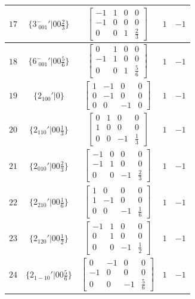 \documentclass[fleqn,8pt]{jsarticle}
\begin{document}
\begin{longtable}{ccccc}
$ 17 $ & $ \{3^{-}_{\,\,001}{}'|0 0 \frac{2}{3}\} $ & $ \begin{bmatrix} -1 & 1 & 0 & 0 \\ -1 & 0 & 0 & 0 \\ 0 & 0 & 1 & \frac{2}{3} \end{bmatrix} $ & $ 1 $ & $ -1 $ \\ \hline
$ 18 $ & $ \{6^{-}_{\,\,001}{}'|0 0 \frac{5}{6}\} $ & $ \begin{bmatrix} 0 & 1 & 0 & 0 \\ -1 & 1 & 0 & 0 \\ 0 & 0 & 1 & \frac{5}{6} \end{bmatrix} $ & $ 1 $ & $ -1 $ \\ \hline
$ 19 $ & $ \{2{}_{100}{}'|0\} $ & $ \begin{bmatrix} 1 & -1 & 0 & 0 \\ 0 & -1 & 0 & 0 \\ 0 & 0 & -1 & 0 \end{bmatrix} $ & $ 1 $ & $ -1 $ \\ \hline
$ 20 $ & $ \{2{}_{110}{}'|0 0 \frac{1}{3}\} $ & $ \begin{bmatrix} 0 & 1 & 0 & 0 \\ 1 & 0 & 0 & 0 \\ 0 & 0 & -1 & \frac{1}{3} \end{bmatrix} $ & $ 1 $ & $ -1 $ \\ \hline
$ 21 $ & $ \{2{}_{010}{}'|0 0 \frac{2}{3}\} $ & $ \begin{bmatrix} -1 & 0 & 0 & 0 \\ -1 & 1 & 0 & 0 \\ 0 & 0 & -1 & \frac{2}{3} \end{bmatrix} $ & $ 1 $ & $ -1 $ \\ \hline
$ 22 $ & $ \{2{}_{210}{}'|0 0 \frac{1}{6}\} $ & $ \begin{bmatrix} 1 & 0 & 0 & 0 \\ 1 & -1 & 0 & 0 \\ 0 & 0 & -1 & \frac{1}{6} \end{bmatrix} $ & $ 1 $ & $ -1 $ \\ \hline
$ 23 $ & $ \{2{}_{120}{}'|0 0 \frac{1}{2}\} $ & $ \begin{bmatrix} -1 & 1 & 0 & 0 \\ 0 & 1 & 0 & 0 \\ 0 & 0 & -1 & \frac{1}{2} \end{bmatrix} $ & $ 1 $ & $ -1 $ \\ \hline
$ 24 $ & $ \{2{}_{1-10}{}'|0 0 \frac{5}{6}\} $ & $ \begin{bmatrix} 0 & -1 & 0 & 0 \\ -1 & 0 & 0 & 0 \\ 0 & 0 & -1 & \frac{5}{6} \end{bmatrix} $ & $ 1 $ & $ -1 $ \\
\end{longtable}
\end{document}
